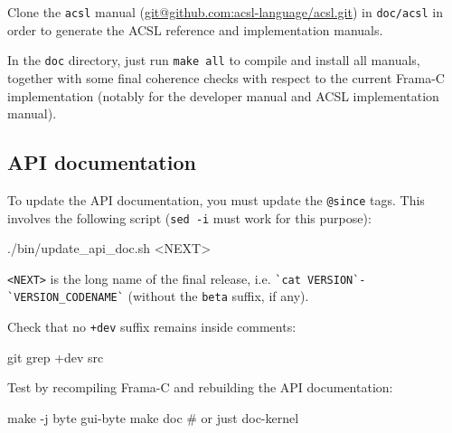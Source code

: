 Clone the \texttt{acsl} manual
(\url{git@github.com:acsl-language/acsl.git}) in
\texttt{doc/acsl} in order to generate the ACSL reference and implementation
manuals.


In the \texttt{doc} directory, just run \texttt{make all} to compile
and install all manuals, together with some final coherence checks with
respect to the current Frama-C implementation (notably
for the developer manual and ACSL implementation manual).

%

\subsection{API documentation}

To update the \textsf{API} documentation, you must update the
\texttt{@since} tags. This involves the following script (\texttt{sed -i} must
work for this purpose):
\begin{shell}
./bin/update_api_doc.sh <NEXT>
\end{shell}
\verb+<NEXT>+ is the long name of the final release, i.e.
\verb+`cat VERSION`-`VERSION_CODENAME`+
(without the \verb+beta+ suffix, if any).

Check that no \verb|+dev| suffix remains inside comments:

\begin{shell}
git grep +dev src
\end{shell}

Test by recompiling Frama-C and rebuilding the API documentation:
\begin{shell}
make -j byte gui-byte
make doc # or just doc-kernel
\end{shell}

